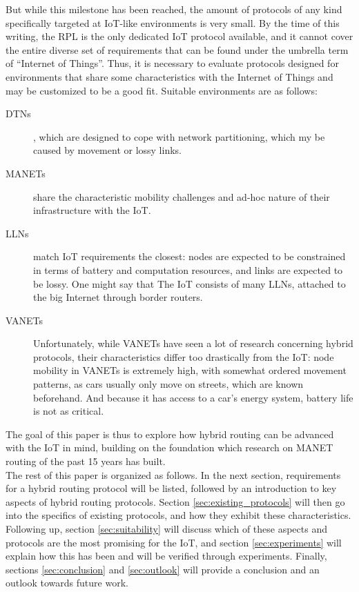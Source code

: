 \documentclass[a4paper,10pt]{scrartcl}
\begin{document}
But while this milestone has been reached, the amount of protocols of any kind specifically targeted at IoT-like environments is very small. By the time of this writing, the \gls{RPL} is the only dedicated IoT protocol available, and it cannot cover the entire diverse set of requirements that can be found under the umbrella term of ``Internet of Things''. Thus, it is necessary to evaluate protocols designed for environments that share some characteristics with the Internet of Things and may be customized to be a good fit. Suitable environments are as follows:
\begin{description}
\item[\glspl{DTN}], which are designed to cope with network partitioning, which my be caused by movement or lossy links.
\item[\glspl{MANET}] share the characteristic mobility challenges and ad-hoc nature of their infrastructure with the IoT.
\item[\glspl{LLN}] match IoT requirements the closest: nodes are expected to be constrained in terms of battery and computation resources, and links are expected to be lossy. One might say that The IoT consists of many LLNs, attached to the big Internet through border routers.
\item[\glspl{VANET}] Unfortunately, while \glspl{VANET} have seen a lot of research concerning hybrid protocols, their characteristics differ too drastically from the IoT: node mobility in VANETs is extremely high, with somewhat ordered movement patterns, as cars usually only move on streets, which are known beforehand. And because it has access to a car's energy system, battery life is not as critical.
\end{description}

The goal of this paper is thus to explore how hybrid routing can be advanced with the \gls{IoT} in mind, building on the foundation which research on \gls{MANET} routing of the past 15 years has built.\\
The rest of this paper is organized as follows. %
In the next section, requirements for a hybrid routing protocol will be listed, followed by an introduction to key aspects of hybrid routing protocols. Section \ref{sec:existing_protocols} will then go into the specifics of existing protocols, and how they exhibit these characteristics. Following up, section \ref{sec:suitability} will discuss which of these aspects and protocols are the most promising for the IoT, and section \ref{sec:experiments} will explain how this has been and will be verified through experiments. Finally, sections \ref{sec:conclusion} and \ref{sec:outlook} will provide a conclusion and an outlook towards future work.
\end{document}
